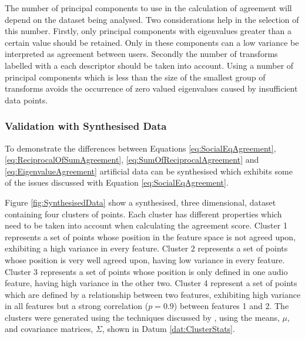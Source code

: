 			The number of principal components to use in the calculation of agreement will depend on the
			dataset being analysed. Two considerations help in the selection of this number. Firstly, only
			principal components with eigenvalues greater than a certain value should be retained. Only in
			these components can a low variance be interpreted as agreement between users. Secondly the number
			of transforms labelled with a each descriptor should be taken into account. Using a number of
			principal components which is less than the size of the smallest group of transforms avoids the
			occurrence of zero valued eigenvalues caused by insufficient data points.


		\subsubsection*{Validation with Synthesised Data}
			To demonstrate the differences between Equations \ref{eq:SocialEqAgreement},
			\ref{eq:ReciprocalOfSumAgreement}, \ref{eq:SumOfReciprocalAgreement} and
			\ref{eq:EigenvalueAgreement} artificial data can be synthesised which exhibits some of the issues
			discussed with Equation \ref{eq:SocialEqAgreement}.
			
			Figure \ref{fig:SynthesisedData} show a synthesised, three dimensional, dataset containing four
			clusters of points. Each cluster has different properties which need to be taken into account when
			calculating the agreement score. Cluster 1 represents a set of points whose position in the feature
			space is not agreed upon, exhibiting a high variance in every feature. Cluster 2 represents a set
			of points whose position is very well agreed upon, having low variance in every feature. Cluster 3
			represents a set of points whose position is only defined in one audio feature, having high
			variance in the other two. Cluster 4 represent a set of points which are defined by a relationship
			between two features, exhibiting high variance in all features but a strong correlation ($p = 0.9$)
			between features 1 and 2. The clusters were generated using the techniques discussed by
			\citet{ripley1987stochastic}, using the means, $\mu$, and covariance matrices, $\Sigma$, shown in
			Datum \ref{dat:ClusterStats}.

